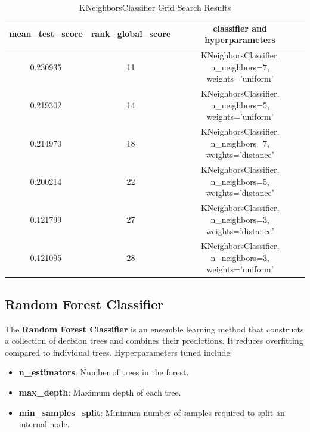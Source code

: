 \documentclass{article}
\begin{document}
\begin{table}[bhtp]
    \centering
    \caption{KNeighborsClassifier Grid Search Results}
    \label{tab:table}
    \begin{tabular}{ccc}
    \toprule
    \textbf{mean\_test\_score} & \textbf{rank\_global\_score} & \textbf{classifier and hyperparameters} \\
    \midrule
    0.230935 & 11 & KNeighborsClassifier, n\_neighbors=7, weights='uniform' \\
    0.219302 & 14 & KNeighborsClassifier, n\_neighbors=5, weights='uniform' \\
    0.214970 & 18 & KNeighborsClassifier, n\_neighbors=7, weights='distance' \\
    0.200214 & 22 & KNeighborsClassifier, n\_neighbors=5, weights='distance' \\
    0.121799 & 27 & KNeighborsClassifier, n\_neighbors=3, weights='distance' \\
    0.121095 & 28 & KNeighborsClassifier, n\_neighbors=3, weights='uniform' \\
    \bottomrule
    \end{tabular}
\end{table}

    
\subsection{Random Forest Classifier}
The \textbf{Random Forest Classifier} is an ensemble learning method that constructs a collection of decision trees and combines their predictions. It reduces overfitting compared to individual trees. Hyperparameters tuned include:
\begin{itemize}
    \item \textbf{n\_estimators}: Number of trees in the forest.
    \item \textbf{max\_depth}: Maximum depth of each tree.
    \item \textbf{min\_samples\_split}: Minimum number of samples required to split an internal node.
\end{itemize}
\end{document}
